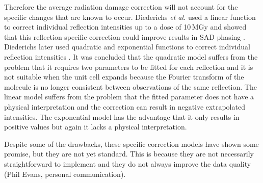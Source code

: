 		Therefore the average radiation damage correction will not account for the specific changes that are known to occur.
		Diederichs \textit{et al.} used a linear function to correct individual reflection intensities up to a dose of 10\,MGy and showed that this reflection specific correction could improve results in SAD phasing \cite{diederichs2003}.
		Diederichs later used quadratic and exponential functions to correct individual reflection intensities \cite{diederichs2006}.
		It was concluded that the quadratic model suffers from the problem that it requires two parameters to be fitted for each reflection and it is not suitable when the unit cell expands because the Fourier transform of the molecule is no longer consistent between observations of the same reflection.
		The linear model suffers from the problem that the fitted parameter does not have a physical interpretation and the correction can result in negative extrapolated intensities.
		The exponential model has the advantage that it only results in positive values but again it lacks a physical interpretation.

		Despite some of the drawbacks, these specific correction models have shown some promise, but they are not yet standard.
        This is because they are not necessarily straightforward to implement and they do not always improve the data quality (Phil Evans, personal communication).
